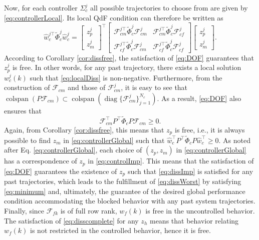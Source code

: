 \documentclass[11pt,print,draftcls,onecolumn,romanappendices]{ieeecolor}
\DeclareMathOperator{\cs}{colspan}
\DeclareMathOperator{\diag}{diag}
\newcommand{\F}{\mathcal{F}}
\begin{document}
{Now, for each controller $\Sigma_c^j$ all possible trajectories to choose from are given by \eqref{eq:controllerLocal}. Its local QdF condition can therefore be written as
\begin{equation}\label{eq:localDiss}
    \hat{w}_c^{j\top}\widetilde{\Phi}_c^j\hat{w}_c^j=\begin{bmatrix}
        z_p^j\\ z_m^j
    \end{bmatrix}^\top\begin{bmatrix}
        \F_{cm}^{j\top}\widetilde{\Phi}_c^j\F_{cm}^j & \F_{cm}^{j\top}\widetilde{\Phi}_c^j\F_{cf}^j\\
        \F_{cf}^{j\top}\widetilde{\Phi}_c^j\F_{cm}^j & \F_{cf}^{j\top}\widetilde{\Phi}_c^j\F_{cf}^j
    \end{bmatrix}\begin{bmatrix}
        z_p^j\\ z_m^j
    \end{bmatrix}.
\end{equation}
According to Corollary \ref{cor:dissfree}, the satisfaction of \eqref{eq:DOF} guarantees that $z_p^j$ is free. In other words, for any past trajectory, there exists a local solution $w_c^j(k)$ such that \eqref{eq:localDiss} is non-negative. Furthermore, from the construction of $\F_{cm}$ and those of $\F_{cm}^j$, it is easy to see that $\cs({P\F_{cm}})\subset\cs(\diag\{\F_{cm}^j\}_{j=1}^{N_c})$. As a result, \eqref{eq:DOF} also ensures that
\begin{equation}\label{eq:dissImp}
    \F_{cm}^\top P^\top\widetilde{\Phi}_cP\F_{cm}\geq0.
\end{equation}
Again, from Corollary \ref{cor:dissfree}, this means that $z_p$ is free, i.e., it is always possible to find $z_m$ in \eqref{eq:controllerGlobal} such that $\hat{w}_c^\top P^\top\widetilde{\Phi}_cP\hat{w}_c^\top\geq0$. As noted after Eq. \eqref{eq:controllerGlobal}, each choice of $(z_p,z_m)$ in \eqref{eq:controllerGlobal} has a correspondence of $z_p$ in \eqref{eq:controlImp}. This means that the satisfaction of \eqref{eq:DOF} guarantees the existence of $z_p$ such that \eqref{eq:dissImp} is satisfied for any past trajectories, which leads to the fulfillment of \eqref{eq:dissWorst} by satisfying \eqref{eq:minimum} and, ultimately, the guarantee of the desired global performance condition accommodating the blocked behavior with any past system trajectories. Finally, since $\F_{fk}$ is of full row rank, $w_f(k)$ is free in the uncontrolled behavior. The satisfaction of \eqref{eq:disscomplete} for any $z_h$ means that behavior relating $w_f(k)$ is not restricted in the controlled behavior, hence it is free.}
\end{document}
